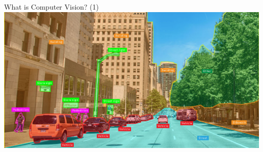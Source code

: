 \documentclass[serif, aspectratio=169]{beamer}
\begin{document}
	\begin{frame}{What is Computer Vision? (1)}
		\centering
		\includegraphics[keepaspectratio, scale=0.3]{pic/computer_vision.jpeg}		
		
	\end{frame}
\end{document}
